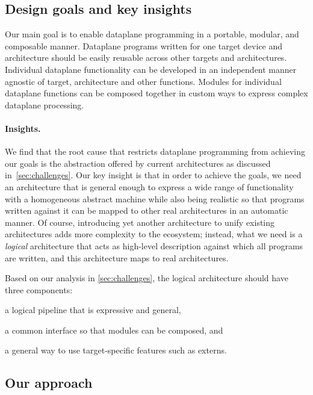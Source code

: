 \documentclass[letterpaper,twocolumn,10pt]{article}
\begin{document}
\subsection{Design goals and key insights}
\label{sec:goals}
\label{sec:insights}

Our main goal is to enable dataplane programming in a portable,
modular, and composable manner.
 Dataplane programs written for one target device
and architecture should be easily reusable across other targets and
architectures.
 Individual dataplane functionality can be
developed in an independent manner agnostic of target, architecture
and other functions.
 Modules for individual dataplane functions can
be composed together in custom ways to express complex dataplane
processing.

\paragraph{Insights.}
We find that the root cause that restricts dataplane programming from
achieving our goals is the abstraction offered by current
architectures as discussed in~\cref{sec:challenges}.  Our key insight
is that in order to achieve the goals, we need an architecture that is
general enough to express a wide range of functionality with a
homogeneous abstract machine while also being realistic so that
programs written against it can be mapped to other real architectures
in an automatic manner. Of course, introducing yet another
architecture to unify existing architectures adds more complexity to
the ecosystem; instead, what we need is a \emph{logical} architecture
that acts as high-level description against which all programs are
written, and this architecture maps to real architectures.

Based on our analysis in \cref{sec:challenges}, the logical
architecture should have three components:
\begin{enumerate*}[label=\roman*)]
  \item a logical pipeline that is expressive and general,
  \item a common interface so that modules can be composed, and
  \item a general way to use target-specific features such as externs.
\end{enumerate*}


\subsection{Our approach}
\label{sec:approach}
\end{document}
